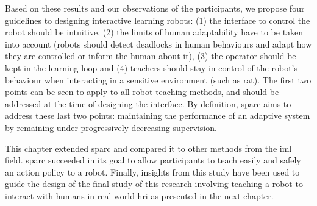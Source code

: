 Based on these results and our observations of the participants, we propose four guidelines to designing interactive learning robots: (1) the interface to control the robot should be intuitive, (2) the limits of human adaptability have to be taken into account (robots should detect deadlocks in human behaviours and adapt how they are controlled or inform the human about it), (3) the operator should be kept in the learning loop and (4) teachers should stay in control of the robot's behaviour when interacting in a sensitive environment (such as \gls{rat}). The first two points can be seen to apply to all robot teaching methods, and should be addressed at the time of designing the interface. By definition, \gls{sparc} aims to address these last two points: maintaining the performance of an adaptive system by remaining under progressively decreasing supervision.

This chapter extended \gls{sparc} and compared it to other methods from the \gls{iml} field. \gls{sparc} succeeded in its goal to allow participants to teach easily and safely an action policy to a robot. Finally, insights from this study have been used to guide the design of the final study of this research involving teaching a robot to interact with humans in real-world \gls{hri} as presented in the next chapter.


